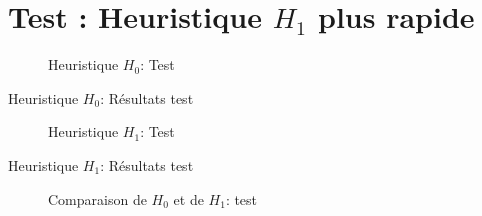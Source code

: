   \section{Test : Heuristique $H_1$ plus rapide}

  \begin{figure}[H]
    \begin{center}
      \boxed{
      \begin{tikzpicture}[scale=0.5]
        
      \end{tikzpicture}}
    \end{center}
    \caption{Heuristique $H_0$: Test }
    \label{fig:H0_4}
  \end{figure}

  \begin{table}[H]
    \centering
    
    \caption{Heuristique $H_0$: Résultats test }
    \label{tab:H0_4}
  \end{table}

  \begin{figure}[H]
    \begin{center}
      \boxed{
      \begin{tikzpicture}[scale=1]
        
      \end{tikzpicture}}
    \end{center}
    \caption{Heuristique $H_1$: Test }
    \label{fig:H1_4}
  \end{figure}

  \begin{table}[H]
    \centering
    
    \caption{Heuristique $H_1$: Résultats test }
    \label{tab:H1_4}
  \end{table}

  \begin{figure}[H]
    \centering
    \begin{tikzpicture}[yscale=0.35]
      
    \end{tikzpicture}
    \caption{Comparaison de $H_0$ et de $H_1$: test }
    \label{fig:comp_4}
  \end{figure}
